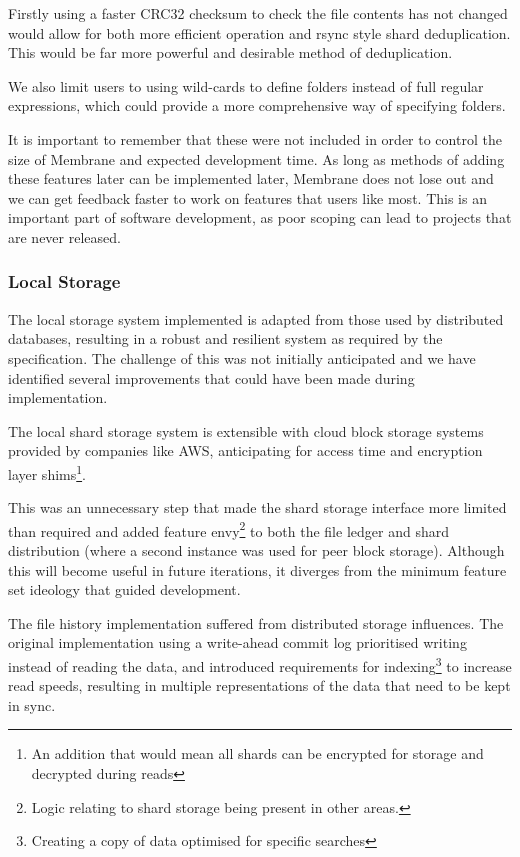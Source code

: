 \documentclass[11pt, a4paper, twoside]{report}
\begin{document}
Firstly using a faster CRC32 checksum to check the file contents has not changed would allow for both more efficient operation and rsync style shard deduplication. This would be far more powerful and desirable method of deduplication.

We also limit users to using wild-cards to define folders instead of full regular expressions, which could provide a more comprehensive way of specifying folders.

It is important to remember that these were not included in order to control the size of Membrane and expected development time. As long as methods of adding these features later can be implemented later, Membrane does not lose out and we can get feedback faster to work on features that users like most. This is an important part of software development, as poor scoping can lead to projects that are never released.

\subsubsection{Local Storage}

The local storage system implemented is adapted from those used by distributed databases, resulting in a robust and resilient system as required by the specification. The challenge of this was not initially anticipated and we have identified several improvements that could have been made during implementation.

The local shard storage system is extensible with cloud block storage systems provided by companies like AWS, anticipating for access time and encryption layer shims\footnote{An addition that would mean all shards can be encrypted for storage and decrypted during reads}.

This was an unnecessary step that made the shard storage interface more limited than required and added feature envy\footnote{Logic relating to shard storage being present in other areas.} to both the file ledger and shard distribution (where a second instance was used for peer block storage). Although this will become useful in future iterations, it diverges from the minimum feature set ideology that guided development.

The file history implementation suffered from distributed storage influences. The original implementation using a write-ahead commit log prioritised writing instead of reading the data, and introduced requirements for indexing\footnote{Creating a copy of data optimised for specific searches} to increase read speeds, resulting in multiple representations of the data that need to be kept in sync.
\end{document}
